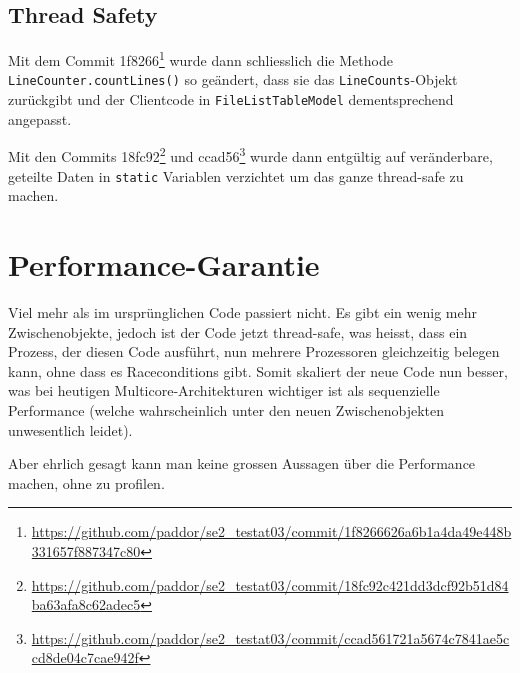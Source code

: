 \documentclass[a4paper]{article}
\newcommand{\java}[1]{\lstinline[style=customjava]{#1}} %
\begin{document}
\subsection{Thread Safety}
Mit dem Commit
1f8266\footnote{\url{https://github.com/paddor/se2_testat03/commit/1f8266626a6b1a4da49e448b331657f887347c80}} wurde dann schliesslich die Methode \java{LineCounter.countLines()} so ge\"andert, dass sie das \java{LineCounts}-Objekt zur\"uckgibt und der Clientcode in \java{FileListTableModel} dementsprechend angepasst.

Mit den Commits
18fc92\footnote{\url{https://github.com/paddor/se2_testat03/commit/18fc92c421dd3dcf92b51d84ba63afa8c62adec5}}
und
ccad56\footnote{\url{https://github.com/paddor/se2_testat03/commit/ccad561721a5674c7841ae5ccd8de04c7cae942f}}
wurde dann entg\"ultig auf ver\"anderbare, geteilte Daten in \java{static} Variablen
verzichtet um das ganze thread-safe zu machen.


\section{Performance-Garantie}
Viel mehr als im urspr\"unglichen Code passiert nicht. Es gibt ein wenig mehr
Zwischenobjekte, jedoch ist der Code jetzt thread-safe, was heisst, dass ein
Prozess, der diesen Code ausf\"uhrt, nun mehrere Prozessoren gleichzeitig
belegen kann, ohne dass es Raceconditions gibt. Somit skaliert der neue Code
nun besser, was bei heutigen Multicore-Architekturen wichtiger ist als
sequenzielle Performance (welche wahrscheinlich unter den neuen
Zwischenobjekten unwesentlich leidet).

Aber ehrlich gesagt kann man keine grossen Aussagen \"uber die Performance
machen, ohne zu profilen.
\end{document}
